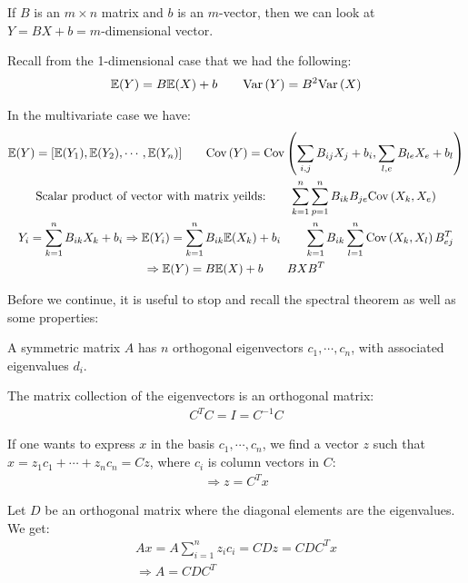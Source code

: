 \par\bigskip
\noindent If $B$ is an $m\times n$ matrix and $b$ is an $m$-vector, then we can look at $Y = BX+b = m$-dimensional vector.\par
\noindent Recall from the 1-dimensional case that we had the following:
\begin{equation*}
  \begin{gathered}
    \mathbb{E}(Y) = B\mathbb{E}(X)+b\qquad \text{Var}\left(Y\right) = B^2\text{Var}\left(X\right)
  \end{gathered}
\end{equation*}
\par\bigskip
\noindent In the multivariate case we have:
\begin{equation*}
  \begin{gathered}
    \mathbb{E}(Y) = [\mathbb{E}(Y_1), \mathbb{E}(Y_2), \cdots, \mathbb{E}(Y_n)]\qquad \text{Cov}\left(Y\right) = \text{Cov}\left(\sum_{i,j}B_{ij}X_j+b_i, \sum_{l,e}B_{le}X_e+b_l\right)\\
    \text{Scalar product of vector with matrix yeilds:}\qquad \sum_{k=1}^{n}\sum_{p=1}^{n}B_{ik}B_{je}\text{Cov}\left(X_k, X_e\right)\\
    Y_i = \sum_{k=1}^{n}B_{ik}X_k+b_i \Rightarrow\mathbb{E}(Y_i) = \sum_{k=1}^{n}B_{ik}\mathbb{E}(X_k)+b_i\qquad \sum_{k=1}^{n}B_{ik}\sum_{l=1}^{n}\text{Cov}\left(X_k,X_l\right)B_{ej}^T\\
    \Rightarrow \mathbb{E}(Y) = B\mathbb{E}(X)+b\qquad BXB^T
  \end{gathered}
\end{equation*}
\par\bigskip
\noindent Before we continue, it is useful to stop and recall the spectral theorem as well as some properties:
\begin{theo}{}
  A symmetric matrix $A$ has $n$ orthogonal eigenvectors $c_1,\cdots, c_n$, with associated eigenvalues $d_i$.
  \par\bigskip
  \noindent The matrix collection of the eigenvectors is an orthogonal matrix:
  \begin{equation*}
    \begin{gathered}
      C^TC = I = C^{-1}C
    \end{gathered}
  \end{equation*}
  \par\bigskip
  \noindent If one wants to express $x$ in the basis $c_1,\cdots,c_n$, we find a vector $z$ such that $x = z_1c_1+\cdots+z_nc_n=Cz$, where $c_i$  is column vectors in $C$:
  \begin{equation*}
    \begin{gathered}
      \Rightarrow z = C^Tx
    \end{gathered}
  \end{equation*}
  \par\bigskip
  \noindent Let $D$ be an orthogonal matrix where the diagonal elements are the eigenvalues. We get:
  \begin{equation*}
    \begin{gathered}
      Ax = A\sum_{i=1}^{n}z_ic_i = CDz = CDC^Tx\\
      \Rightarrow A = CDC^T
    \end{gathered}
  \end{equation*}
\end{theo}
